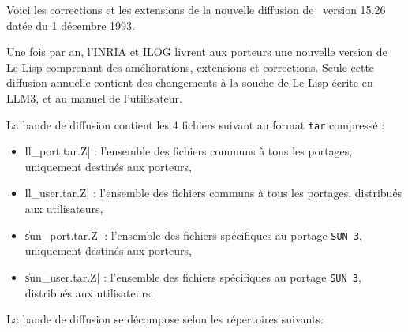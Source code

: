 

\frenchspacing
\setlength{\parindent}{0in}
\setlength{\parskip}{3ex}
\raggedbottom


\bigskip

Voici les corrections et les extensions de la nouvelle diffusion de
\LeLisp\ version 15.26 dat\'{e}e du 1 d\'{e}cembre 1993.

Une fois par an, l'INRIA et ILOG livrent aux porteurs une nouvelle
version de Le-Lisp comprenant des am\'{e}liorations, extensions et
corrections.  Seule cette diffusion annuelle contient des changements
\`{a} la souche de Le-Lisp \'{e}crite en LLM3, et au manuel de l'utilisateur.


La bande de diffusion contient les 4 fichiers suivant au format {\tt tar}
compress\'{e} :
\begin{itemize}
\item \|ll_port.tar.Z| : l'ensemble des fichiers communs \`{a} tous
les portages, uniquement destin\'{e}s aux porteurs,
\item \|ll_user.tar.Z| : l'ensemble des fichiers communs \`{a} tous
les portages, distribu\'{e}s aux utilisateurs,
\item \|sun_port.tar.Z| : l'ensemble des fichiers sp\'{e}cifiques au
portage {\tt SUN 3}, uniquement destin\'{e}s aux porteurs,
\item \|sun_user.tar.Z| : l'ensemble des fichiers sp\'{e}cifiques au
portage {\tt SUN 3}, distribu\'{e}s aux utilisateurs.
\end{itemize}

La bande de diffusion se d\'{e}compose selon les r\'{e}pertoires suivants:

